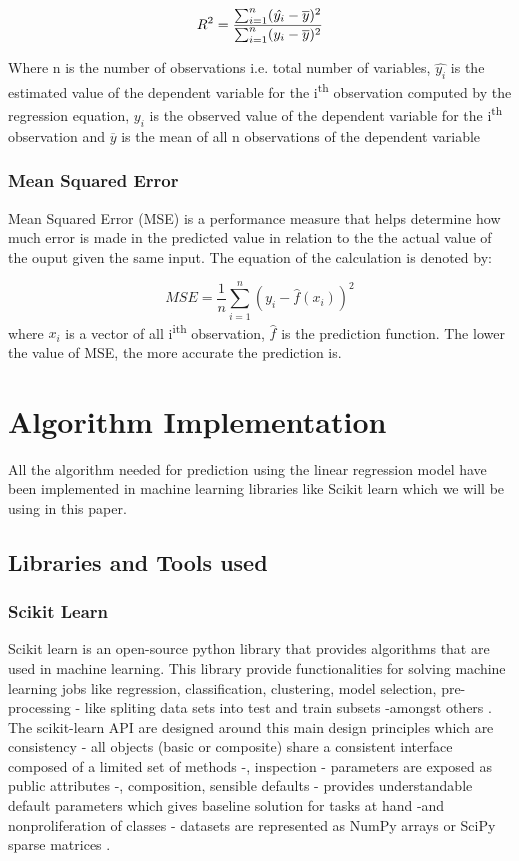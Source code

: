 \documentclass[conference]{IEEEtran}
\begin{document}
	\begin{equation}
		R\textsuperscript{2} = \label{three}\frac{\sum_{i=1}^{n}(\hat{y_i}-\overline{y})^2}{\sum_{i=1}^{n}(y_i-\overline{y})^2}
	\end{equation}
	
	Where n is the number of observations i.e. total number of variables, $\hat{y_i}$ is the estimated value of the dependent variable for the i\textsuperscript{th} observation computed by the regression equation, $y_i$ is the observed value of the dependent variable for the i\textsuperscript{th} observation and $\overline{y}$ is the mean of all n observations of the dependent variable \cite{DAE79009}

\subsubsection{Mean Squared Error}
Mean Squared Error (MSE) is a performance measure that helps determine how much error is made in the predicted value in relation to the the actual value of the ouput given the same input. The equation of the calculation is denoted by:

	\begin{equation}
		MSE = \label{four}\frac{1}{n}\sum_{i=1}^{n}(y_i-\hat{f}(x_i))^2
	\end{equation}
	where $x_i$ is a vector of all i\textsuperscript{ith} observation, $\hat{f}$ is the prediction function. The lower the value of MSE, the more accurate the prediction is.
\section{Algorithm Implementation}
All the algorithm needed  for prediction using the linear regression model have been implemented in machine learning libraries like Scikit learn which we will be using in this paper.
\subsection{Libraries and Tools used}
\subsubsection{Scikit Learn}
Scikit learn is an open-source python library that provides algorithms that are used in machine learning. This library provide functionalities for solving machine learning jobs like 
regression, classification, clustering, model selection, pre-processing - like spliting data sets into test and train subsets -amongst others \cite{scikit_learn}. The scikit-learn API are designed around this main design principles which are consistency - all objects (basic or composite) share a consistent interface composed of a limited set of methods -, inspection - parameters are exposed as public attributes -, composition, sensible defaults - provides understandable default parameters which gives baseline solution for tasks at hand -and nonproliferation of classes - datasets are represented as NumPy arrays or SciPy sparse matrices \cite{sklearn_api}.
\end{document}
